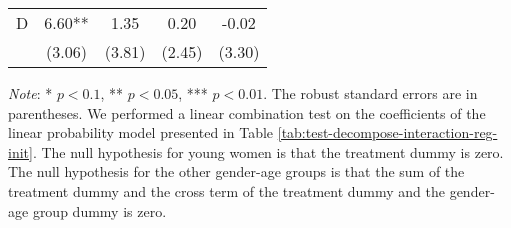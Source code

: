 \documentclass[12pt, a4paper]{article}
\begin{document}
\begin{table}[H]
\begin{threeparttable}
\begin{tabular}[t]{lcccc}
\hspace{1em}D & 6.60** & 1.35 & 0.20 & -0.02\\
\hspace{1em} & (3.06) & (3.81) & (2.45) & (3.30)\\
\bottomrule
\end{tabular}
\begin{tablenotes}
\item \emph{Note}: * $p < 0.1$, ** $p < 0.05$, *** $p < 0.01$. The robust standard errors are in parentheses. We performed a linear combination test on the coefficients of the linear probability model presented in Table \ref{tab:test-decompose-interaction-reg-init}. The null hypothesis for young women is that the treatment dummy is zero. The null hypothesis for the other gender-age groups is that the sum of the treatment dummy and the cross term of the treatment dummy and the gender-age group dummy is zero.
\end{tablenotes}
\end{threeparttable}
\end{table}
\end{document}

